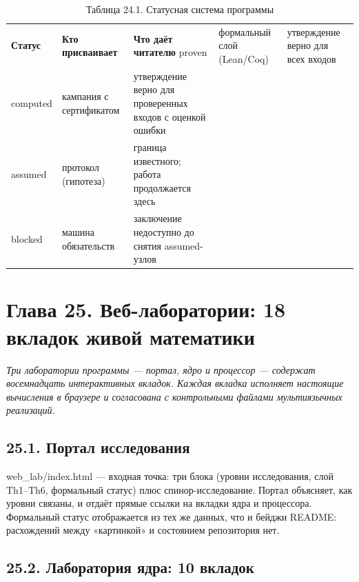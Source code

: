 \documentclass[11pt,a4paper]{article}
\begin{document}
\begin{table}[htbp]\centering\small
\caption{Таблица 24.1. Статусная система программы}
\begin{tabular}{p{} p{} p{}}
\toprule
\textbf{Статус} & \textbf{Кто присваивает} & \textbf{Что даёт читателю}
\midrule
proven & формальный слой (Lean/Coq) & утверждение верно для всех входов \\
computed & кампания с сертификатом & утверждение верно для проверенных входов с оценкой ошибки \\
assumed & протокол (гипотеза) & граница известного; работа продолжается здесь \\
blocked & машина обязательств & заключение недоступно до снятия assumed-узлов \\
\bottomrule
\end{tabular}
\end{table}

\section{Глава 25. Веб-лаборатории: 18 вкладок живой математики}

\noindent\textit{\color{copper}Три лаборатории программы — портал, ядро и процессор — содержат восемнадцать интерактивных вкладок. Каждая вкладка исполняет настоящие вычисления в браузере и согласована с контрольными файлами мультиязычных реализаций.}

\subsection{25.1. Портал исследования}

web\_lab/index.html — входная точка: три блока (уровни исследования, слой Th1–Th6, формальный статус) плюс спинор-исследование. Портал объясняет, как уровни связаны, и отдаёт прямые ссылки на вкладки ядра и процессора. Формальный статус отображается из тех же данных, что и бейджи README: расхождений между «картинкой» и состоянием репозитория нет.

\subsection{25.2. Лаборатория ядра: 10 вкладок}
\end{document}
